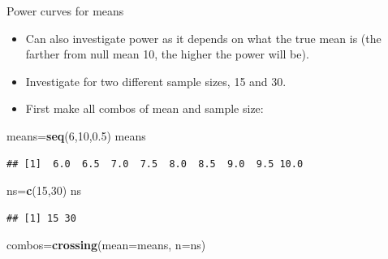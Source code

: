 \documentclass[ignorenonframetext,]{beamer}
\newenvironment{Shaded}{\begin{snugshade}}{\end{snugshade}}
\newcommand{\DataTypeTok}[1]{\textcolor[rgb]{0.13,0.29,0.53}{#1}}
\newcommand{\DecValTok}[1]{\textcolor[rgb]{0.00,0.00,0.81}{#1}}
\newcommand{\FloatTok}[1]{\textcolor[rgb]{0.00,0.00,0.81}{#1}}
\newcommand{\KeywordTok}[1]{\textcolor[rgb]{0.13,0.29,0.53}{\textbf{#1}}}
\newcommand{\NormalTok}[1]{#1}
\providecommand{\tightlist}{%
  \setlength{\itemsep}{0pt}\setlength{\parskip}{0pt}}
\begin{document}
\begin{frame}[fragile]{Power curves for means}
\protect\hypertarget{power-curves-for-means}{}

\begin{itemize}
\tightlist
\item
  Can also investigate power as it depends on what the true mean is (the
  farther from null mean 10, the higher the power will be).
\item
  Investigate for two different sample sizes, 15 and 30.
\item
  First make all combos of mean and sample size:
\end{itemize}

\begin{Shaded}
\begin{Highlighting}[]
\NormalTok{means=}\KeywordTok{seq}\NormalTok{(}\DecValTok{6}\NormalTok{,}\DecValTok{10}\NormalTok{,}\FloatTok{0.5}\NormalTok{)}
\NormalTok{means}
\end{Highlighting}
\end{Shaded}

\begin{verbatim}
## [1]  6.0  6.5  7.0  7.5  8.0  8.5  9.0  9.5 10.0
\end{verbatim}

\begin{Shaded}
\begin{Highlighting}[]
\NormalTok{ns=}\KeywordTok{c}\NormalTok{(}\DecValTok{15}\NormalTok{,}\DecValTok{30}\NormalTok{)}
\NormalTok{ns}
\end{Highlighting}
\end{Shaded}

\begin{verbatim}
## [1] 15 30
\end{verbatim}

\begin{Shaded}
\begin{Highlighting}[]
\NormalTok{combos=}\KeywordTok{crossing}\NormalTok{(}\DataTypeTok{mean=}\NormalTok{means, }\DataTypeTok{n=}\NormalTok{ns)}
\end{Highlighting}
\end{Shaded}

\end{frame}
\end{document}
